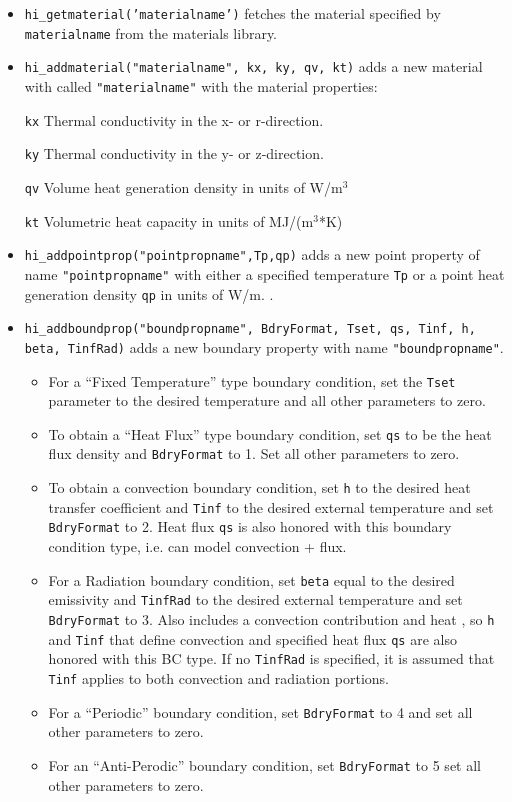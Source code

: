 \begin{itemize}
\item \texttt{hi\_getmaterial('materialname')} fetches the material specified by \texttt{materialname} 
from the materials library.

\item \texttt{hi\_addmaterial("materialname", kx, ky, qv, kt)} adds a new material with
called \texttt{"materialname"} with the material properties:

\texttt{kx} Thermal conductivity in the x- or r-direction.

\texttt{ky} Thermal conductivity in the y- or z-direction.

\texttt{qv} Volume heat generation density in units of W/m$^{3}$

\texttt{kt} Volumetric heat capacity in units of MJ/(m$^{3}$*K)

\item \texttt{hi\_addpointprop("pointpropname",Tp,qp)} adds a new point property of
name \texttt{"pointpropname"} with either a specified temperature
\texttt{Tp} or a point heat generation density \texttt{qp} in units of W/m. .

\item \texttt{hi\_addboundprop("boundpropname", BdryFormat, Tset, qs, Tinf, h, beta, TinfRad)}
 adds a new boundary property with name {\tt "boundpropname"}.
\begin{itemize}
\item For a ``Fixed Temperature'' type boundary condition, set the {\tt Tset} parameter to the
desired temperature and all other parameters to zero.
\item To obtain a ``Heat Flux'' type boundary condition, set {\tt qs} to be the heat flux density and
{\tt BdryFormat} to 1. Set all other parameters to zero.
\item To obtain a convection boundary condition, set {\tt h} to the desired heat transfer coefficient and
{\tt Tinf} to the desired external temperature and set {\tt BdryFormat} to 2.  Heat flux {\tt qs} is also honored with this boundary
condition type, i.e. can model convection + flux.
\item For a Radiation boundary condition, set {\tt beta} equal to the desired emissivity and {\tt TinfRad} to the 
desired external temperature and set {\tt BdryFormat} to 3. Also includes a convection contribution and heat , so {\tt h} and {\tt Tinf} that define convection and specified heat flux {\tt qs} are also honored with this BC type.  If no {\tt TinfRad} is specified, it is assumed that {\tt Tinf} applies to both convection and radiation portions.
\item For a ``Periodic'' boundary condition, set {\tt BdryFormat} to 4 and set all other
parameters to zero.
\item For an ``Anti-Perodic'' boundary condition, set {\tt BdryFormat} to 5 set all other
parameters to zero.
\end{itemize}


\end{itemize}
